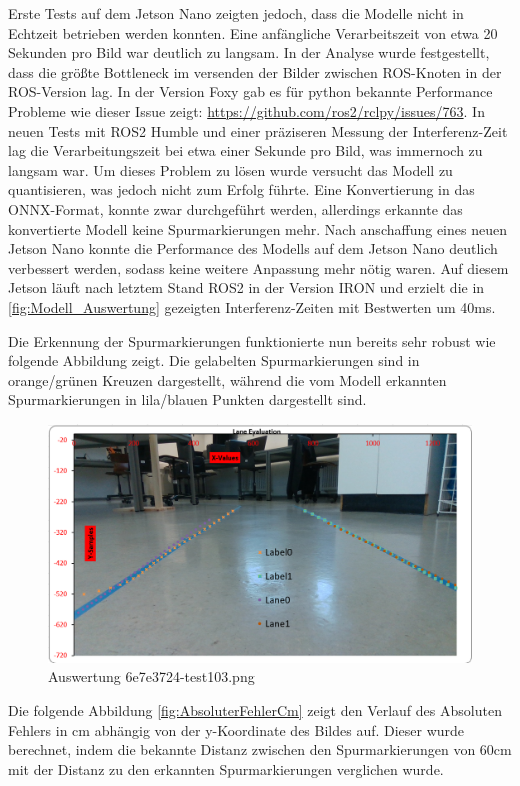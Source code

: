 \documentclass{article}
\begin{document}
            
            Erste Tests auf dem Jetson Nano zeigten jedoch, dass die Modelle nicht in Echtzeit betrieben werden konnten. Eine anfängliche Verarbeitszeit von etwa 20 Sekunden pro Bild war deutlich zu langsam.
            In der Analyse wurde festgestellt, dass die größte Bottleneck im versenden der Bilder zwischen ROS-Knoten in der ROS-Version lag. In der Version Foxy gab es für python bekannte Performance Probleme wie dieser Issue zeigt: \url{https://github.com/ros2/rclpy/issues/763}.
            In neuen Tests mit ROS2 Humble und einer präziseren Messung der Interferenz-Zeit lag die Verarbeitungszeit bei etwa einer Sekunde pro Bild, was immernoch zu langsam war.
            Um dieses Problem zu lösen wurde versucht das Modell zu quantisieren, was jedoch nicht zum Erfolg führte.
            Eine Konvertierung in das ONNX-Format, konnte zwar durchgeführt werden, allerdings erkannte das konvertierte Modell keine Spurmarkierungen mehr.
            Nach anschaffung eines neuen Jetson Nano konnte die Performance des Modells auf dem Jetson Nano deutlich verbessert werden, sodass keine weitere Anpassung mehr nötig waren.
            Auf diesem Jetson läuft nach letztem Stand ROS2 in der Version IRON und erzielt die in \ref{fig:Modell_Auswertung} gezeigten Interferenz-Zeiten mit Bestwerten um 40ms.

            Die Erkennung der Spurmarkierungen funktionierte nun bereits sehr robust wie folgende Abbildung zeigt.
            Die gelabelten Spurmarkierungen sind in orange/grünen Kreuzen dargestellt, während die vom Modell erkannten Spurmarkierungen in lila/blauen Punkten dargestellt sind.
            \begin{figure}[h!]
                \includegraphics[width=\linewidth]{Auswertung_6e7e3724-test_103.png}
                \caption{Auswertung 6e7e3724-test103.png}
                \label{fig:Auswertung_6e7e3724-test_103.png}
            \end{figure}
            Die folgende Abbildung \ref{fig:AbsoluterFehlerCm} zeigt den Verlauf des Absoluten Fehlers in cm abhängig von der y-Koordinate des Bildes auf.
            Dieser wurde berechnet, indem die bekannte Distanz zwischen den Spurmarkierungen von 60cm mit der Distanz zu den erkannten Spurmarkierungen verglichen wurde.
\end{document}
